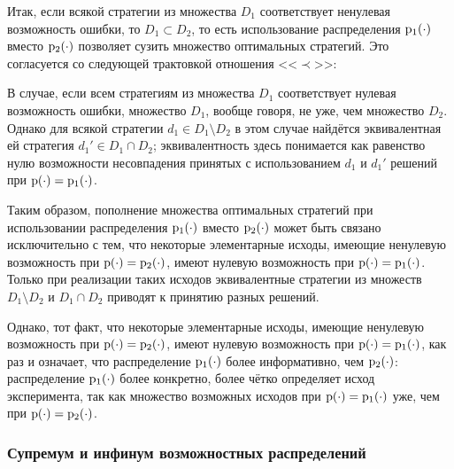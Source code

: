 Итак, если всякой стратегии из множества $D_1$ соответствует ненулевая возможность ошибки, то $D_1\subset D_2$, то есть использование распределения ${\mathrm{p}}_1(\cdot)$ вместо ${\mathrm{p}}_2(\cdot)$ позволяет сузить множество оптимальных стратегий. 
Это согласуется со следующей трактовкой отношения <<$\prec$>>: 
\begin{center}  \end{center}

В случае, если всем стратегиям из множества $D_1$ соответствует нулевая возможность ошибки, множество $D_1$, вообще говоря, не уже, чем множество $D_2$. Однако для всякой стратегии $d_1\in D_1\setminus D_2$ в этом случае найдётся эквивалентная ей стратегия $d_1'\in D_1\cap D_2$; эквивалентность здесь понимается как равенство нулю возможности несовпадения принятых с использованием $d_1$ и $d_1'$ решений при ${\mathrm{p}}(\cdot) = {\mathrm{p}}_1(\cdot)$.

Таким образом, пополнение множества оптимальных стратегий при использовании распределения ${\mathrm{p}}_1(\cdot)$ вместо ${\mathrm{p}}_2(\cdot)$ может быть связано исключительно с тем, что некоторые элементарные исходы, имеющие ненулевую возможность при ${\mathrm{p}}(\cdot) = {\mathrm{p}}_2(\cdot)$, имеют нулевую возможность при ${\mathrm{p}}(\cdot) = {\mathrm{p}}_1(\cdot)$. Только при реализации таких исходов эквивалентные стратегии из множеств $D_1\setminus D_2$ и $D_1\cap D_2$ приводят к принятию разных решений.

Однако, тот факт, что некоторые элементарные исходы, имеющие ненулевую возможность при ${\mathrm{p}}(\cdot) = {\mathrm{p}}_2(\cdot)$, имеют нулевую возможность при ${\mathrm{p}}(\cdot) = {\mathrm{p}}_1(\cdot)$, как раз и означает, что распределение ${\mathrm{p}}_1(\cdot)$ более информативно, чем ${\mathrm{p}}_2(\cdot)$: распределение ${\mathrm{p}}_1(\cdot)$ более конкретно, более чётко определяет исход эксперимента, так как множество возможных исходов при ${\mathrm{p}}(\cdot) = {\mathrm{p}}_1(\cdot)$ уже, чем при ${\mathrm{p}}(\cdot) = {\mathrm{p}}_2(\cdot)$.	
	
\subsubsection{Супремум и инфинум возможностных распределений}
\label{inf_sup_poss}

